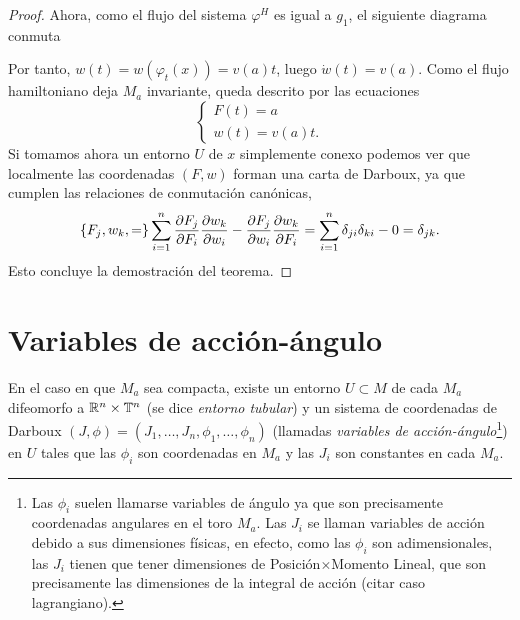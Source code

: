 \begin{proof}
Ahora, como el flujo del sistema $\varphi^H$ es igual a $g_1$, el siguiente diagrama conmuta
\begin{center}
 \end{center}
 Por tanto, $w(t)=w(\varphi_t(x))=v(a) t$, luego $\dot w(t)=v(a)$. Como el flujo hamiltoniano deja $M_a$ invariante, queda descrito por las ecuaciones
 \begin{equation*}
   \begin{cases}
     F(t)=a \\
     w(t)=v(a)t.
   \end{cases}
 \end{equation*}
 Si tomamos ahora un entorno $U$ de $x$ simplemente conexo podemos ver que localmente las coordenadas $(F,w)$ forman una carta de Darboux, ya que cumplen las relaciones de conmutación canónicas,
 \begin{equation*}
   \left\lbrace F_j,w_k,=\right\rbrace\sum_{i=1}^n \frac{\partial F_j}{\partial F_i} \frac{\partial w_k}{\partial w_i} - \frac{\partial F_j}{\partial w_i} \frac{\partial w_k}{\partial F_i} = \sum_{i=1}^n \delta_{ji}\delta_{ki}-0 = \delta_{jk}.
 \end{equation*}
Esto concluye la demostración del teorema.
 \end{proof}

 \section{Variables de acción-ángulo}

 En el caso en que $M_a$ sea compacta, existe un entorno $U\subset M$ de cada $M_a$ difeomorfo a $\mathbb{R}^n \times \mathbb{T}^n$ (se dice \emph{entorno tubular}) y un sistema de coordenadas de Darboux $(J,\phi)=(J_1,\dots,J_n,\phi_1,\dots,\phi_n)$ (llamadas \emph{variables de acción-ángulo}\footnote{Las $\phi_i$ suelen llamarse variables de ángulo ya que son precisamente coordenadas angulares en el toro $M_a$. Las $J_i$ se llaman variables de acción debido a sus dimensiones físicas, en efecto, como las $\phi_i$ son adimensionales, las $J_i$ tienen que tener dimensiones de Posición$\times$Momento Lineal, que son precisamente las dimensiones de la integral de acción (citar caso lagrangiano).}) en $U$ tales que las $\phi_i$ son coordenadas en $M_a$ y las $J_i$ son constantes en cada $M_a$. 

